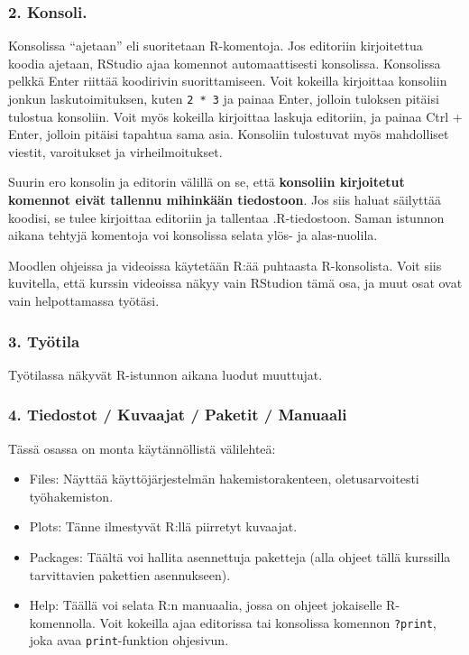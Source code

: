 \documentclass[
]{book}
\providecommand{\tightlist}{%
  \setlength{\itemsep}{0pt}\setlength{\parskip}{0pt}}
\begin{document}
\hypertarget{konsoli.}{%
\subsubsection*{2. Konsoli.}\label{konsoli.}}

Konsolissa ``ajetaan'' eli suoritetaan R-komentoja. Jos editoriin kirjoitettua koodia ajetaan, RStudio ajaa komennot automaattisesti konsolissa. Konsolissa pelkkä Enter riittää koodirivin suorittamiseen. Voit kokeilla kirjoittaa konsoliin jonkun laskutoimituksen, kuten \texttt{2\ *\ 3} ja painaa Enter, jolloin tuloksen pitäisi tulostua konsoliin. Voit myös kokeilla kirjoittaa laskuja editoriin, ja painaa Ctrl + Enter, jolloin pitäisi tapahtua sama asia. Konsoliin tulostuvat myös mahdolliset viestit, varoitukset ja virheilmoitukset.

Suurin ero konsolin ja editorin välillä on se, että \textbf{konsoliin kirjoitetut komennot eivät tallennu mihinkään tiedostoon}. Jos siis haluat säilyttää koodisi, se tulee kirjoittaa editoriin ja tallentaa .R-tiedostoon. Saman istunnon aikana tehtyjä komentoja voi konsolissa selata ylös- ja alas-nuolila.

Moodlen ohjeissa ja videoissa käytetään R:ää puhtaasta R-konsolista. Voit siis kuvitella, että kurssin videoissa näkyy vain RStudion tämä osa, ja muut osat ovat vain helpottamassa työtäsi.

\hypertarget{tyuxf6tila}{%
\subsubsection*{3. Työtila}\label{tyuxf6tila}}

Työtilassa näkyvät R-istunnon aikana luodut muuttujat.

\hypertarget{tiedostot-kuvaajat-paketit-manuaali}{%
\subsubsection*{4. Tiedostot / Kuvaajat / Paketit / Manuaali}\label{tiedostot-kuvaajat-paketit-manuaali}}

Tässä osassa on monta käytännöllistä välilehteä:

\begin{itemize}
\tightlist
\item
  Files: Näyttää käyttöjärjestelmän hakemistorakenteen, oletusarvoitesti työhakemiston.
\item
  Plots: Tänne ilmestyvät R:llä piirretyt kuvaajat.
\item
  Packages: Täältä voi hallita asennettuja paketteja (alla ohjeet tällä kurssilla tarvittavien pakettien asennukseen).
\item
  Help: Täällä voi selata R:n manuaalia, jossa on ohjeet jokaiselle R-komennolla. Voit kokeilla ajaa editorissa tai konsolissa komennon \texttt{?print}, joka avaa \texttt{print}-funktion ohjesivun.
\end{itemize}
\end{document}
